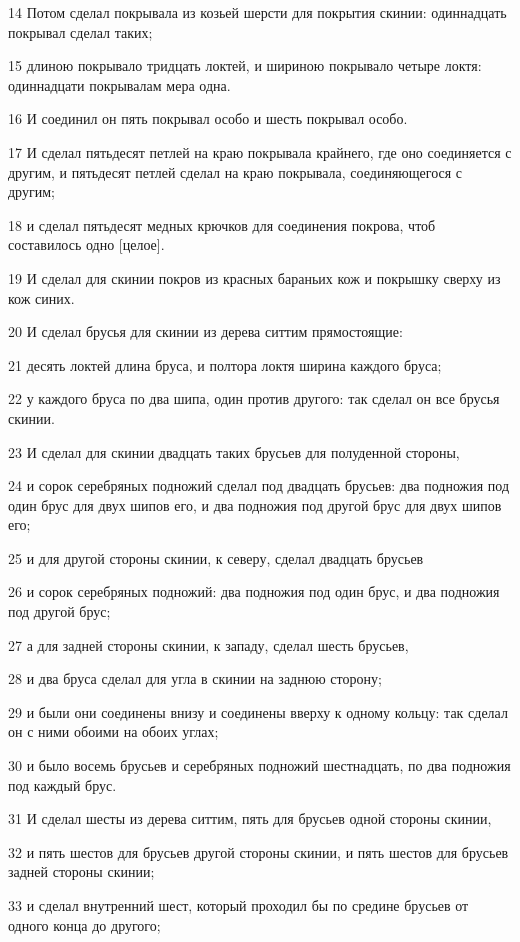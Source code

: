 \par 14 Потом сделал покрывала из козьей шерсти для покрытия скинии: одиннадцать покрывал сделал таких;
\par 15 длиною покрывало тридцать локтей, и шириною покрывало четыре локтя: одиннадцати покрывалам мера одна.
\par 16 И соединил он пять покрывал особо и шесть покрывал особо.
\par 17 И сделал пятьдесят петлей на краю покрывала крайнего, где оно соединяется с другим, и пятьдесят петлей сделал на краю покрывала, соединяющегося с другим;
\par 18 и сделал пятьдесят медных крючков для соединения покрова, чтоб составилось одно [целое].
\par 19 И сделал для скинии покров из красных бараньих кож и покрышку сверху из кож синих.
\par 20 И сделал брусья для скинии из дерева ситтим прямостоящие:
\par 21 десять локтей длина бруса, и полтора локтя ширина каждого бруса;
\par 22 у каждого бруса по два шипа, один против другого: так сделал он все брусья скинии.
\par 23 И сделал для скинии двадцать таких брусьев для полуденной стороны,
\par 24 и сорок серебряных подножий сделал под двадцать брусьев: два подножия под один брус для двух шипов его, и два подножия под другой брус для двух шипов его;
\par 25 и для другой стороны скинии, к северу, сделал двадцать брусьев
\par 26 и сорок серебряных подножий: два подножия под один брус, и два подножия под другой брус;
\par 27 а для задней стороны скинии, к западу, сделал шесть брусьев,
\par 28 и два бруса сделал для угла в скинии на заднюю сторону;
\par 29 и были они соединены внизу и соединены вверху к одному кольцу: так сделал он с ними обоими на обоих углах;
\par 30 и было восемь брусьев и серебряных подножий шестнадцать, по два подножия под каждый брус.
\par 31 И сделал шесты из дерева ситтим, пять для брусьев одной стороны скинии,
\par 32 и пять шестов для брусьев другой стороны скинии, и пять шестов для брусьев задней стороны скинии;
\par 33 и сделал внутренний шест, который проходил бы по средине брусьев от одного конца до другого;
